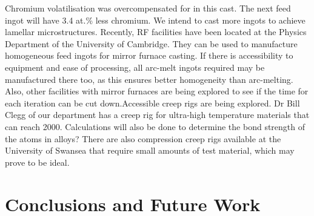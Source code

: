 Chromium volatilisation was overcompensated for in this cast. The next feed ingot will have 3.4 at.\% less chromium. We intend to cast more ingots to achieve lamellar microstructures. Recently, RF facilities have been located at the Physics Department of the University of Cambridge. They can be used to manufacture homogeneous feed ingots for mirror furnace casting. If there is accessibility to equipment and ease of processing, all arc-melt ingots required may be manufactured there too, as this ensures better homogeneity than arc-melting. Also, other facilities with mirror furnaces are being explored to see if the time for each iteration can be cut down.Accessible creep rigs are being explored. Dr Bill Clegg of our department has a creep rig for ultra-high temperature materials that can reach 2000\celsius. Calculations will also be done to determine the bond strength of the atoms in alloys? There are also compression creep rigs available at the University of Swansea that require small amounts of test material, which may prove to be ideal.

\chapter{Conclusions and Future Work}
